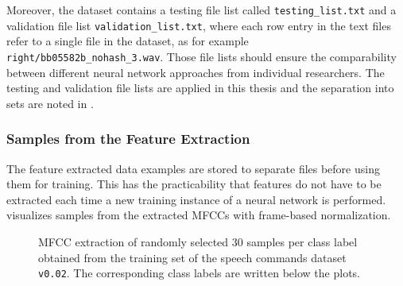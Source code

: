 Moreover, the dataset contains a testing file list called \texttt{testing\_list.txt} and a validation file list \texttt{validation\_list.txt}, where each row entry in the text files refer to a single file in the dataset, as for example \texttt{right/bb05582b\_nohash\_3.wav}.
Those file lists should ensure the comparability between different neural network approaches from individual researchers.
The testing and validation file lists are applied in this thesis and the separation into sets are noted in .



\subsubsection{Samples from the Feature Extraction}
The feature extracted data examples are stored to separate files before using them for training.
This has the practicability that features do not have to be extracted each time a new training instance of a neural network is performed.
 visualizes samples from the extracted MFCCs with frame-based normalization.
\begin{figure}[!ht]
  \centering
  \caption{MFCC extraction of randomly selected 30 samples per class label obtained from the training set of the speech commands dataset \texttt{v0.02}. The corresponding class labels are written below the plots.}
  \label{fig:exp_dataset_speech_cmd_mfcc}
\end{figure}

